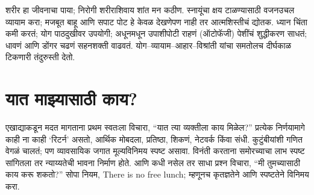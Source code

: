 शरीर हा जीवनाचा पाया; निरोगी शरीराशिवाय शांत मन कठीण. स्नायूंचा क्षय टाळण्यासाठी वजनउचल व्यायाम करा; मजबूत बाहू आणि सपाट पोट हे केवळ देखणेपण नाही तर आत्मशिस्तीचं द्योतक. ध्यान चिंता कमी करतं; योग पाठदुखीवर उपयोगी; अधूनमधून उपाशीपोटी राहणं (ऑटोफॅजी) पेशींचं शुद्धीकरण साधतं; धावणं आणि डोंगर चढणं सहनशक्ती वाढवतं. योग–व्यायाम–आहार–विश्रांती यांचा समतोलच दीर्घकाळ टिकणारी तंदुरुस्ती देतो.

\section*{यात माझ्यासाठी काय?}

एखाद्याकडून मदत मागताना प्रथम स्वतःला विचारा, “यात त्या व्यक्तीला काय मिळेल?” प्रत्येक निर्णयामागे काही ना काही ‘रिटर्न’ असतो, आर्थिक मोबदला, प्रतिष्ठा, शिकणं, नेटवर्क किंवा संधी. कुटुंबीयांशी गणित वेगळं चालतं; पण व्यावसायिक जगात मूल्यविनिमय स्पष्ट असावा. विनंती करताना समोरच्याचा लाभ स्पष्ट सांगितला तर न्याय्यतेची भावना निर्माण होते. आणि कधी नसेल तर साधा प्रश्न विचारा, “मी तुमच्यासाठी काय करू शकतो?” सोपा नियम, There is no free lunch; म्हणूनच कृतज्ञतेने आणि स्पष्टतेने विनिमय करा.
